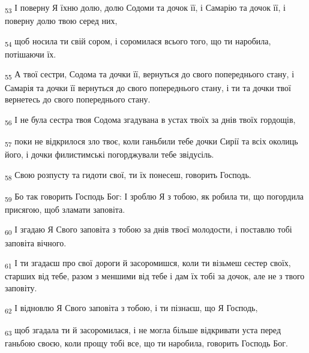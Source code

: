 \begin{tcolorbox}
\textsubscript{53} І поверну Я їхню долю, долю Содоми та дочок її, і Самарію та дочок її, і поверну долю твою серед них,
\end{tcolorbox}
\begin{tcolorbox}
\textsubscript{54} щоб носила ти свій сором, і соромилася всього того, що ти наробила, потішаючи їх.
\end{tcolorbox}
\begin{tcolorbox}
\textsubscript{55} А твої сестри, Содома та дочки її, вернуться до свого попереднього стану, і Самарія та дочки її вернуться до свого попереднього стану, і ти та дочки твої вернетесь до свого попереднього стану.
\end{tcolorbox}
\begin{tcolorbox}
\textsubscript{56} І не була сестра твоя Содома згадувана в устах твоїх за днів твоїх гордощів,
\end{tcolorbox}
\begin{tcolorbox}
\textsubscript{57} поки не відкрилося зло твоє, коли ганьбили тебе дочки Сирії та всіх околиць його, і дочки филистимські погорджували тебе звідусіль.
\end{tcolorbox}
\begin{tcolorbox}
\textsubscript{58} Свою розпусту та гидоти свої, ти їх понесеш, говорить Господь.
\end{tcolorbox}
\begin{tcolorbox}
\textsubscript{59} Бо так говорить Господь Бог: І зроблю Я з тобою, як робила ти, що погордила присягою, щоб зламати заповіта.
\end{tcolorbox}
\begin{tcolorbox}
\textsubscript{60} І згадаю Я Свого заповіта з тобою за днів твоєї молодости, і поставлю тобі заповіта вічного.
\end{tcolorbox}
\begin{tcolorbox}
\textsubscript{61} І ти згадаєш про свої дороги й засоромишся, коли ти візьмеш сестер своїх, старших від тебе, разом з меншими від тебе і дам їх тобі за дочок, але не з твого заповіту.
\end{tcolorbox}
\begin{tcolorbox}
\textsubscript{62} І відновлю Я Свого заповіта з тобою, і ти пізнаєш, що Я Господь,
\end{tcolorbox}
\begin{tcolorbox}
\textsubscript{63} щоб згадала ти й засоромилася, і не могла більше відкривати уста перед ганьбою своєю, коли прощу тобі все, що ти наробила, говорить Господь Бог.
\end{tcolorbox}

